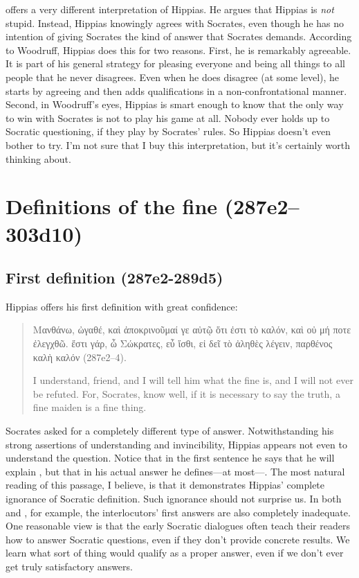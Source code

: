 \documentclass[11pt]{article}
\begin{document}
\citet{woodruff1982} offers a very different interpretation of Hippias.  He argues that Hippias is \emph{not} stupid.  Instead, Hippias knowingly agrees with Socrates, even though he has no intention of giving Socrates the kind of answer that Socrates demands.  According to Woodruff, Hippias does this for two reasons.  First, he is remarkably agreeable.  It is part of his general strategy for pleasing everyone and being all things to all people that he never disagrees.  Even when he does disagree (at some level), he starts by agreeing and then adds qualifications in a non-confrontational manner.  Second, in Woodruff's eyes, Hippias is smart enough to know that the only way to win with Socrates is not to play his game at all.  Nobody ever holds up to Socratic questioning, if they play by Socrates' rules.  So Hippias doesn't even bother to try.  I'm not sure that I buy this interpretation, but it's certainly worth thinking about.


\section{Definitions of the fine (287e2--303d10)}

\subsection{First definition (287e2-289d5)}

Hippias offers his first definition with great confidence:

\begin{quote}
    Μανθάνω, ὠγαθέ, καὶ ἀποκρινοῦμαί γε αὐτῷ ὅτι ἐστι τὸ καλόν, καὶ οὐ μή ποτε ἐλεγχθῶ. ἔστι γάρ, ὦ Σώκρατες, εὖ ἴσθι, εἰ δεῖ τὸ ἀληθὲς λέγειν, παρθένος καλὴ καλόν (287e2--4).

    I understand, friend, and I will tell him what the fine is, and I will not ever be refuted.  For, Socrates, know well, if it is necessary to say the truth, a fine maiden is a fine thing.
\end{quote}

Socrates asked for a completely different type of answer.  Notwithstanding his strong assertions of understanding and invincibility, Hippias appears not even to understand the question.  Notice that in the first sentence he says that he will explain , but that in his actual answer he defines---at most---.  The most natural reading of this passage, I believe, is that it demonstrates Hippias' complete ignorance of Socratic definition.  Such ignorance should not surprise us.  In both  and , for example, the interlocutors' first answers are also completely inadequate.  One reasonable view is that the early Socratic dialogues often teach their readers how to answer Socratic questions, even if they don't provide concrete results.  We learn what sort of thing would qualify as a proper answer, even if we don't ever get truly satisfactory answers.
\end{document}
